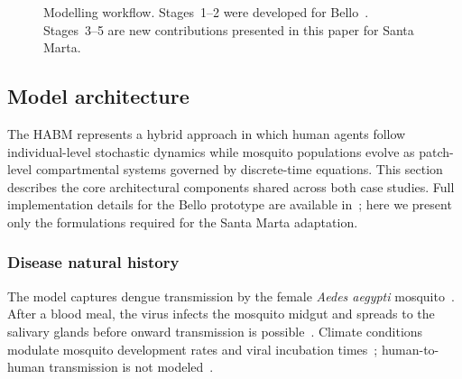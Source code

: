 \documentclass[applsci,article,accept,pdftex,moreauthors]{Definitions/mdpi}
\begin{document}
\begin{figure}[H]
\caption{Modelling workflow. Stages~1--2 were developed for Bello~\protect\cite{escudero2023hybrid,uribe2023ccc}. Stages~3--5 are new contributions presented in this paper for Santa Marta.}
\label{fig:pipeline}
\end{figure}

\subsection{Model architecture}
\label{sec:architecture}

The HABM represents a hybrid approach in which human agents follow individual-level stochastic dynamics while mosquito populations evolve as patch-level compartmental systems governed by discrete-time equations. This section describes the core architectural components shared across both case studies. Full implementation details for the Bello prototype are available in~\cite{escudero2023hybrid,uribe2023ccc}; here we present only the formulations required for the Santa Marta adaptation.

\subsubsection{Disease natural history}
\label{sec:natural_history}

The model captures dengue transmission by the female \textit{Aedes aegypti} mosquito~\cite{kakarla2019temperature}. After a blood meal, the virus infects the mosquito midgut and spreads to the salivary glands before onward transmission is possible~\cite{escudero2023hybrid}. Climate conditions modulate mosquito development rates and viral incubation times~\cite{goindin2015parity,Leung2020}; human-to-human transmission is not modeled~\cite{caminade2017global}.
\end{document}
